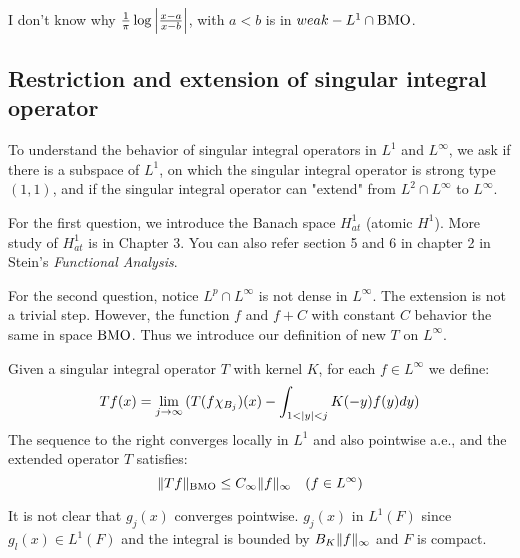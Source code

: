\begin{remark}
    {\color{blue}I don't know why $\frac{1}{\pi}\log{\left\lvert\frac{x-a}{x-b}\right\rvert}$, with $a<b$ is in $weak-L^1\cap\operatorname{BMO}$}.
\end{remark}
\subsection{Restriction and extension of singular integral operator}
To understand the behavior of singular integral operators in $L^1$ and $L^\infty$, we ask if there is a subspace of $L^1$, on which
the singular integral operator is strong type $(1,1)$, and if the singular integral operator can "extend" from $L^2\cap L^\infty$ to $L^\infty$.\par
For the first question, we introduce the Banach space $H^1_{at}$ (atomic $H^1$). More study of $H^1_{at}$ is in Chapter 3. You can also refer section 5 and 6 in chapter 2 in Stein's
\emph{Functional Analysis}.\par
For the second question, notice $L^p\cap L^\infty$ is not dense in $L^\infty$. The extension is not a trivial step. However, the function $f$ and $f+C$ with constant $C$
behavior the same in space $\operatorname{BMO}$. Thus we introduce our definition of new $T$ on $L^\infty$.
\begin{proposition}
    Given a singular integral operator $T$ with kernel $K$, for each $f\in L^\infty$ we define:
    \begin{equation*}
        T f(x)=\lim_{j\to\infty}{(T(f\chi_{B_j})(x)-\int_{1<\left\lvert y\right\rvert<j}K(-y)f(y)d y)}
    \end{equation*}
    The sequence to the right converges locally in $L^1$ and also pointwise a.e., and the extended operator $T$ satisfies:
    \begin{equation}
        \lVert Tf\rVert_{\operatorname{BMO}}\leq C_\infty\lVert f\rVert_\infty\quad (f\in L^\infty)
    \end{equation}
\end{proposition}
\begin{remark}
    {\color{blue}It is not clear that $g_j(x)$ converges pointwise}. $g_j(x)$ in $L^1(F)$ since $g_l(x)\in L^1(F)$ and the integral is bounded by $B_K\lVert f\rVert_\infty$ and $F$ is compact.\par
\end{remark}
